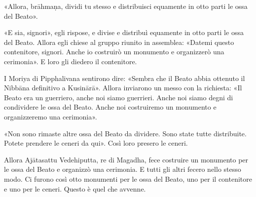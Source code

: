 «Allora, brāhmaṇa, dividi tu stesso e distribuisci equamente in otto
parti le ossa del Beato».


«E sia, signori», egli rispose, e divise e distribuì equamente in otto
parti le ossa del Beato. Allora egli chiese al gruppo riunito in
assemblea: «Datemi questo contenitore, signori. Anche io costruirò un
monumento e organizzerò una cerimonia». E loro gli diedero il
contenitore.


I Moriya di Pipphalivana sentirono dire: «Sembra che il Beato abbia
ottenuto il Nibbāna definitivo a Kusinārā». Allora inviarono un messo
con la richiesta: «Il Beato era un guerriero, anche noi siamo guerrieri.
Anche noi siamo degni di condividere le ossa del Beato. Anche noi
costruiremo un monumento e organizzeremo una cerimonia».


«Non sono rimaste altre ossa del Beato da dividere. Sono state tutte
distribuite. Potete prendere le ceneri da qui». Così loro presero le
ceneri.


Allora Ajātasattu Vedehiputta, re di Magadha, fece costruire un
monumento per le ossa del Beato e organizzò una cerimonia. E tutti gli
altri fecero nello stesso modo. Ci furono così otto monumenti per le
ossa del Beato, uno per il contenitore e uno per le ceneri. Questo è
quel che avvenne.




